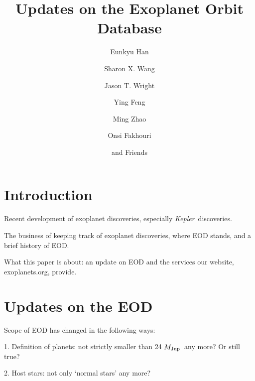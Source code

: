 \documentclass[11pt,preprint]{aastex}
\def\kepler{\textit{Kepler}}
\def\mjup{$M_{\rm Jup}$}
\begin{document}
\begin{CJK*}{UTF8}{gbsn}

\title{Updates on the Exoplanet Orbit Database}

\author{Eunkyu Han}
\author{Sharon X. Wang}
\author{Jason T. Wright}
\author{Ying Feng}
\author{Ming Zhao}
\author{Onsi Fakhouri}
\author{and Friends}



\begin{abstract}

\end{abstract}  

\section{Introduction}\label{sec:intro}

Recent development of exoplanet discoveries, especially
\kepler\ discoveries.

The business of keeping track of exoplanet discoveries, where EOD
stands, and a brief history of EOD.

What this paper is about: an update on EOD and the services our
website, exoplanets.org, provide.


\section{Updates on the EOD}\label{sec:update}


Scope of EOD has changed in the following ways:

1. Definition of planets: not strictly smaller than 24 \mjup\ any
more? Or still true?

2. Host stars: not only `normal stars' any more?


\end{CJK*}
\end{document}
